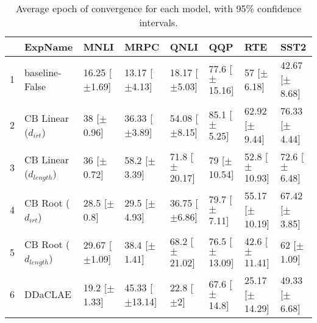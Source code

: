 \begin{table*}[ht]
\centering
\begingroup\small
\begin{tabular}{rlllllll}
  \hline
 & ExpName & MNLI & MRPC & QNLI & QQP & RTE & SST2 \\ 
  \hline
1 & baseline-False & 16.25 [$\pm$1.69] & 13.17 [$\pm$4.13] & 18.17 [$\pm$5.03] & 77.6 [$\pm$15.16] & 57 [$\pm$6.18] & 42.67 [$\pm$8.68] \\ 
  2 & CB Linear ($d_{irt}$) & 38 [$\pm$0.96] & 36.33 [$\pm$3.89] & 54.08 [$\pm$8.15] & 85.1 [$\pm$5.25] & 62.92 [$\pm$9.44] & 76.33 [$\pm$4.44] \\ 
  3 & CB Linear ($d_{length}$) & 36 [$\pm$0.72] & 58.2 [$\pm$3.39] & 71.8 [$\pm$20.17] & 79 [$\pm$10.54] & 52.8 [$\pm$10.93] & 72.6 [$\pm$6.48] \\ 
  4 & CB Root ($d_{irt}$) & 28.5 [$\pm$0.8] & 29.5 [$\pm$4.93] & 36.75 [$\pm$6.86] & 79.7 [$\pm$7.11] & 55.17 [$\pm$10.19] & 67.42 [$\pm$3.85] \\ 
  5 & CB Root ($d_{length}$) & 29.67 [$\pm$1.09] & 38.4 [$\pm$1.41] & 68.2 [$\pm$21.02] & 76.5 [$\pm$13.09] & 42.6 [$\pm$11.41] & 62 [$\pm$1.09] \\ 
  6 & DDaCLAE & 19.2 [$\pm$1.33] & 45.33 [$\pm$13.14] & 22.8 [$\pm$2] & 67.6 [$\pm$14.8] & 25.17 [$\pm$14.29] & 49.33 [$\pm$6.68] \\ 
   \hline
\end{tabular}
\endgroup
\caption{Average epoch of convergence for each model, with 95\% confidence intervals.} 
\label{tab:epoch_lstm-True}
\end{table*}
